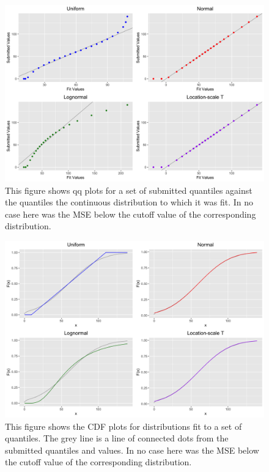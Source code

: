 \documentclass[11pt,notitlepage]{isuthesis}
\begin{document}
\begin{figure}[htbp]
\centerline{\includegraphics[scale=.15]{Images/qq_11_12_5.png}}
\caption[QQ plot for quantile fit]{This figure shows qq plots for a set of
submitted quantiles against the quantiles the continuous distribution to which
it was fit. In no case here was the MSE below the cutoff value of the 
corresponding distribution.}
\label{fig:qqfits}
\end{figure}

\begin{figure}[htbp]
\centerline{\includegraphics[scale=.15]{Images/cdf_11_12_5.png}}
\caption[CDF plot for quantile fit]{This figure shows the CDF plots for 
distributions fit to a set of quantiles. The grey line is a line of connected 
dots from the submitted quantiles and values. 
In no case here was the MSE below the cutoff value of the 
corresponding distribution.}
\label{fig:cdffits}
\end{figure}
\end{document}
